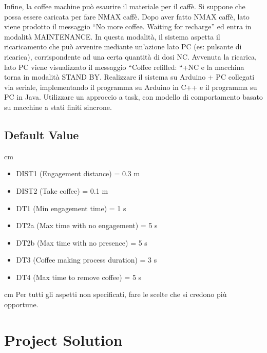 \documentclass{article}
\begin{document}
\newline\newline
Infine, la coffee machine può esaurire il materiale per il caffè. Si suppone che possa essere caricata per fare NMAX caffè. Dopo aver fatto NMAX caffè, lato viene prodotto il messaggio “No more coffee. Waiting for recharge” ed entra in modalità MAINTENANCE.  In questa modalità, il sistema aspetta il ricaricamento che può avvenire mediante un’azione lato PC (es: pulsante di ricarica), corrispondente ad una certa quantità di dosi NC. Avvenuta la ricarica, lato PC viene visualizzato il messaggio “Coffee refilled: “+NC e la macchina torna in modalità STAND BY.
\newline\newline
Realizzare il sistema su Arduino + PC collegati via seriale, implementando il programma su Arduino in C++ e il programma su PC in Java.  Utilizzare un approccio a task, con modello di comportamento basato su macchine a stati finiti sincrone.

\subsection{Default Value}
 cm
\begin{itemize}
	\item DIST1 (Engagement distance) = 0.3 m
	\item DIST2 (Take coffee) = 0.1 m
	\item DT1 (Min engagement time) = 1 s
	\item DT2a (Max time with no engagement) = 5 s
	\item DT2b (Max time with no presence) = 5 s
	\item DT3 (Coffee making process duration) = 3 s
	\item DT4 (Max time to remove coffee) = 5 s
\end{itemize}
 cm
Per tutti gli aspetti non specificati, fare le scelte che si credono più opportune.
\newpage


\section{Project Solution}
\end{document}
